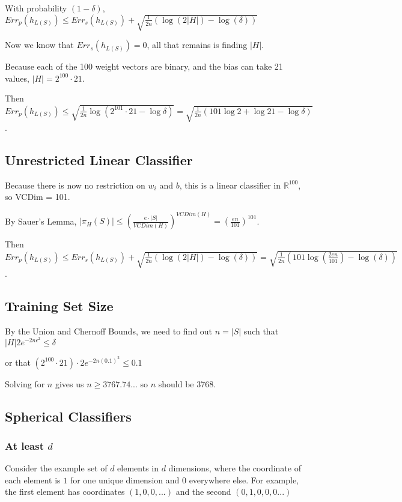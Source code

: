 \documentclass[]{article}
\begin{document}
With probability $(1-\delta)$, $Err_p(h_{L(S)}) \le Err_s(h_{L(S)}) + \sqrt{\frac{1}{2n}(\log(2|H|) - \log(\delta))}$

Now we know that $Err_s(h_{L(S)}) = 0$, all that remains is finding $|H|$.

Because each of the 100 weight vectors are binary, and the bias can take 21 values, $|H| = 2^{100} \cdot 21$.

Then $Err_p(h_{L(S)}) \le \sqrt{\frac{1}{2n} \log(2^{101}\cdot 21 - \log \delta)} = \sqrt{\frac{1}{2n}(101 \log 2 + \log 21-\log \delta)}$.

\subsection{Unrestricted Linear Classifier}
Because there is now no restriction on $w_i$ and $b$, this is a linear classifier in $\mathbb{R}^{100}$, so VCDim = 101.

By Sauer's Lemma, $|\pi_H(S)| \le (\frac{e\cdot |S|}{VCDim(H)})^{VCDim(H)} = (\frac{en}{101})^{101}$.

Then $Err_p(h_{L(S)}) \le Err_s(h_{L(S)}) + \sqrt{\frac{1}{2n}(\log(2|H|) - \log(\delta))} = \sqrt{\frac{1}{2n}(101\log(\frac{2en}{101}) - \log(\delta))}$.

\subsection{Training Set Size}

By the Union and Chernoff Bounds, we need to find out $n=|S|$ such that $|H|2e^{-2n\epsilon^2} \le \delta$

or that $(2^{100} \cdot 21)\cdot 2 e^{-2n(0.1)^2} \le 0.1$

Solving for $n$ gives us $n \ge 3767.74...$ so $n$ should be 3768.

\subsection{Spherical Classifiers}

\subsubsection{At least $d$}
Consider the example set of $d$ elements in $d$ dimensions, where the coordinate of each element is $1$ for one unique dimension and $0$ everywhere else. For example, the first element has coordinates $(1,0,0,...)$ and the second $(0,1,0,0,0...)$
\end{document}
